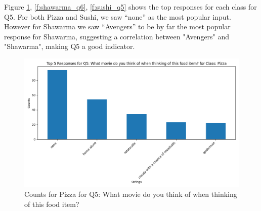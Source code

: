 Figure \ref{f:pizza_q5}, \ref{f:shawarma_q6}, \ref{f:sushi_q5} shows the top responses for each class for Q5.
For both Pizza and Sushi, we saw “none” as the most popular input. However for Shawarma we saw “Avengers” to be by far the most popular response for Shawarma, suggesting a 
correlation between "Avengers" and "Shawarma", making Q5 a good indicator.

\begin{figure}[h]
    \centerline{\includegraphics[width=\columnwidth]{data/top_5_responses_Q5_Pizza.png}}
    \caption{Counts for Pizza for Q5: What movie do you think of when thinking of this food item?}
    \label{f:pizza_q5}
\end{figure}

